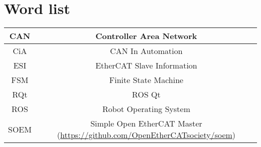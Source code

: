 \section{Word list}


\begin{center}

	\begin{tabular}{|c|c|}
		\hline
		CAN & Controller Area Network \\
		\hline
		CiA & CAN In Automation \\
		\hline
		ESI & EtherCAT Slave Information \\
		\hline
		FSM & Finite State Machine \\
		\hline
		RQt & ROS Qt \\
		\hline
		ROS & Robot Operating System \\
		\hline
		SOEM & Simple Open EtherCAT Master (\url{https://github.com/OpenEtherCATsociety/soem}) \\
		\hline
	\end{tabular}

\end{center}


